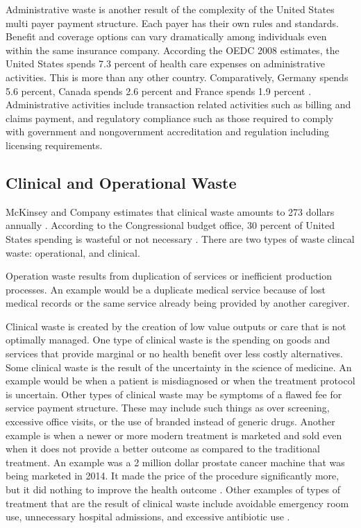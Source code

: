 \documentclass[sigconf]{acmart}
\begin{document}
Administrative waste is another result of the complexity of the United States multi payer payment structure. Each payer has their own rules and standards. Benefit and coverage options can vary dramatically among individuals even within the same insurance company.  According the OEDC 2008 estimates, the United States spends 7.3 percent of health care expenses on administrative activities. This is more than any other country. Comparatively, Germany spends 5.6 percent, Canada spends 2.6 percent and France spends 1.9 percent \cite{OEDC}.  Administrative activities include transaction related activities such as billing and claims payment, and regulatory compliance such as those required to comply with government and nongovernment accreditation and regulation including licensing requirements.

\subsection{Clinical and Operational Waste}

McKinsey and Company estimates that clinical waste amounts to 273 dollars annually \cite{springer}. According to the Congressional budget office, 30 percent of United States spending is wasteful or not necessary \cite{www-google-consumer}. There are two types of waste clincal waste: operational, and clinical.


Operation waste results from duplication of services or inefficient production processes.  An example would be a duplicate medical service because of lost medical records or the same service already being provided by another caregiver.


Clinical waste is created by the creation of low value outputs or care that is not optimally managed. One type of clinical waste is the spending on goods and services that provide marginal or no health benefit over less costly alternatives.  Some clinical waste is the result of the uncertainty in the science of medicine. An example would be when a patient is misdiagnosed or when the treatment protocol is uncertain. Other types of clinical waste may be symptoms of a flawed fee for service payment structure. These may include such things as over screening, excessive office visits, or the use of branded instead of generic drugs.  Another example is when a newer or more modern treatment is marketed and sold even when it does not provide a better outcome as compared to the traditional treatment. An example was a 2 million dollar prostate cancer machine that was being marketed in 2014. It made the price of the procedure significantly more, but it did nothing to improve the health outcome \cite{www-google-consumer}.  Other examples of types of treatment that are the result of clinical waste include avoidable emergency room use, unnecessary hospital admissions, and excessive antibiotic use \cite{milbank}. 
 
\end{document}
